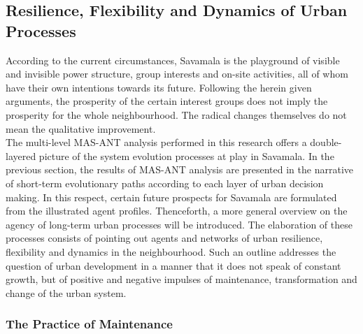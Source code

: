 \documentclass[11pt]{report}
\begin{document}
\subsection{Resilience, Flexibility and Dynamics of Urban Processes}

According to the current circumstances, Savamala is the playground of 
visible and invisible power structure, group interests and on-site activities, all of whom have their own intentions towards its future.
Following the herein given arguments, the prosperity of the certain interest groups does not imply the prosperity for the whole neighbourhood. The radical changes themselves do not mean the qualitative improvement.
\\
The multi-level MAS-ANT analysis performed in this research offers a double-layered picture of the system evolution processes at play in Savamala.
In the previous section, the results of MAS-ANT analysis are presented in the narrative of short-term evolutionary paths according to each layer of urban decision making.
In this respect, certain future prospects for Savamala are formulated from the illustrated agent profiles.
Thenceforth, a more general overview on the agency of long-term urban processes will be introduced. The elaboration of these processes consists of pointing out agents and networks of urban resilience, flexibility and dynamics in the neighbourhood.
Such an outline addresses the question of urban development in a manner that it does not speak of constant growth, but of positive and negative impulses of maintenance, transformation and change of the urban system.

\subsubsection{The Practice of Maintenance}
\end{document}
